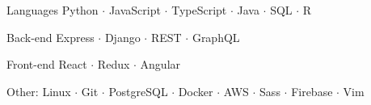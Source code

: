


\begin{cvskills}

\cvskill
  {Languages } %
  {Python $\cdot$ JavaScript $\cdot$ TypeScript $\cdot$ Java $\cdot$ SQL $\cdot$ R } %


  \cvskill
    {Back-end} %
    {Express $\cdot$ Django $\cdot$ REST $\cdot$ GraphQL} %

  \cvskill
    {Front-end} %
    {React $\cdot$ Redux $\cdot$ Angular} %

\cvskill
  {Other:} %
  {Linux $\cdot$ Git $\cdot$ PostgreSQL $\cdot$ Docker $\cdot$ AWS $\cdot$ Sass $\cdot$ Firebase $\cdot$ Vim } %




\end{cvskills}
